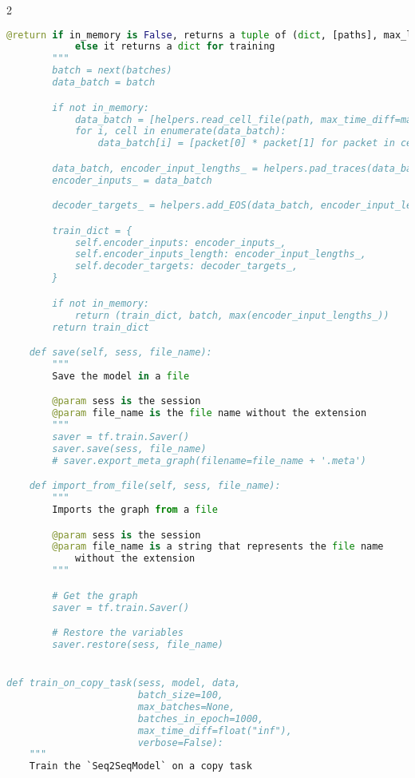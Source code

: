 \begin{landscape}
\begin{multicols}{2}
\begin{lstlisting}[language=Python]
        @return if in_memory is False, returns a tuple of (dict, [paths], max_length) where paths is a list of paths for each batch
            else it returns a dict for training
        """
        batch = next(batches)
        data_batch = batch

        if not in_memory:
            data_batch = [helpers.read_cell_file(path, max_time_diff=max_time_diff) for path in batch]
            for i, cell in enumerate(data_batch):
                data_batch[i] = [packet[0] * packet[1] for packet in cell]

        data_batch, encoder_input_lengths_ = helpers.pad_traces(data_batch, reverse=self.reverse, seq_width=self.seq_width)
        encoder_inputs_ = data_batch

        decoder_targets_ = helpers.add_EOS(data_batch, encoder_input_lengths_)

        train_dict = {
            self.encoder_inputs: encoder_inputs_,
            self.encoder_inputs_length: encoder_input_lengths_,
            self.decoder_targets: decoder_targets_,
        }

        if not in_memory:
            return (train_dict, batch, max(encoder_input_lengths_))
        return train_dict

    def save(self, sess, file_name):
        """
        Save the model in a file

        @param sess is the session
        @param file_name is the file name without the extension
        """
        saver = tf.train.Saver()
        saver.save(sess, file_name)
        # saver.export_meta_graph(filename=file_name + '.meta')

    def import_from_file(self, sess, file_name):
        """
        Imports the graph from a file

        @param sess is the session
        @param file_name is a string that represents the file name
            without the extension
        """

        # Get the graph
        saver = tf.train.Saver()

        # Restore the variables
        saver.restore(sess, file_name)


def train_on_copy_task(sess, model, data,
                       batch_size=100,
                       max_batches=None,
                       batches_in_epoch=1000,
                       max_time_diff=float("inf"),
                       verbose=False):
    """
    Train the `Seq2SeqModel` on a copy task


\end{lstlisting}
\end{multicols}
\end{landscape}
